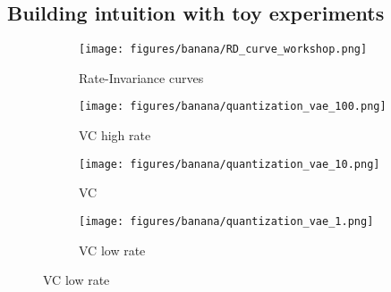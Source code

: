 \documentclass[final]{article}
\begin{document}
\subsection{Building intuition with toy experiments}
\label{sec:toy_experiments}


\begin{figure}
     \centering
     \begin{minipage}{.36\linewidth}
     \begin{subfigure}[h]{\linewidth}
         \centering
         \texttt{[image: figures/banana/RD\_curve\_workshop.png]}
         \vspace{-2em}
         \caption{Rate-Invariance curves}
         \label{fig:bananas_RI}
     \end{subfigure}
     \end{minipage}
     \qquad
     \begin{minipage}{.48\linewidth}
\begin{subfigure}{0.32\columnwidth}
         \centering
         \texttt{[image: figures/banana/quantization\_vae\_100.png]}
         \vspace{-1.3em}
         \caption{VC high rate}
         \label{fig:bananas_sweepvae_100}
     \end{subfigure}
     \begin{subfigure}{0.32\columnwidth}
         \centering
         \texttt{[image: figures/banana/quantization\_vae\_10.png]}
         \vspace{-1.3em}
         \caption{VC}
         \label{fig:bananas_sweepvae_10}
     \end{subfigure}
     \begin{subfigure}{0.32\columnwidth}
         \centering
         \texttt{[image: figures/banana/quantization\_vae\_1.png]}
         \vspace{-1.3em}
         \caption{VC low rate}
         \label{fig:bananas_sweepvae_1}
     \end{subfigure}
     

\end{minipage}
\end{figure}
\end{document}
